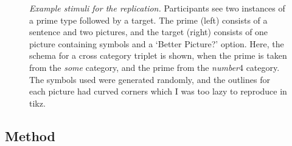 \documentclass[10pt]{article}
\begin{document}
\begin{multicols}{2}
\begin{figure}[ht]
  \caption{\emph{Example stimuli for the replication.} Participants see two instances of a prime type followed by a target.
    The prime (left) consists of a sentence and two pictures, and the target (right) consists of one picture containing symbols and a `Better Picture?' option.
    Here, the schema for a cross category triplet is shown, when the prime is taken from the \emph{some} category, and the prime from the \emph{number}4 category.
    The symbols used were generated randomly, and the outlines for each picture had curved corners which I was too lazy to reproduce in tikz.
  }
  \label{fig:excards}
\end{figure}

\subsection{Method}
\label{sec:method}



\end{multicols}
\end{document}
